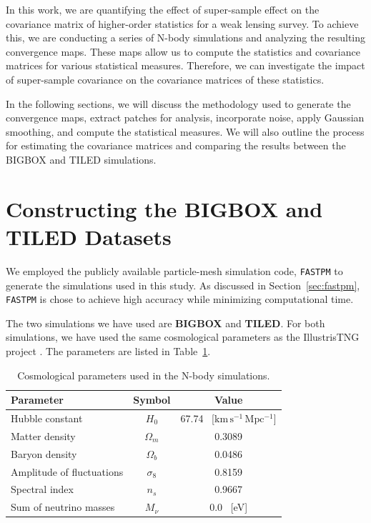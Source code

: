 
In this work, we are quantifying the effect of super-sample effect on the covariance matrix of higher-order statistics for a weak lensing survey. To achieve this, we are conducting a series of N-body simulations and analyzing the resulting convergence maps. These maps allow us to compute the statistics and covariance matrices for various statistical measures. Therefore, we can investigate the impact of super-sample covariance on the covariance matrices of these statistics.

In the following sections, we will discuss the methodology used to generate the convergence maps, extract patches for analysis, incorporate noise, apply Gaussian smoothing, and compute the statistical measures. We will also outline the process for estimating the covariance matrices and comparing the results between the BIGBOX and TILED simulations. 

\section{Constructing the BIGBOX and TILED Datasets}
We employed the publicly available particle-mesh simulation code, \texttt{FASTPM} \citep{10.1093/mnras/stw2123} to generate the simulations used in this study. As discussed in Section~\ref{sec:fastpm}, \texttt{FASTPM} is chose to achieve high accuracy while minimizing computational time. 

The two simulations we have used are \textbf{BIGBOX} and \textbf{TILED}. For both simulations, we have used the same cosmological parameters as the IllustrisTNG project \citep{2019ComAC...6....2N}. The parameters are listed in Table~\ref{tab:simulations}. 

\begin{table}[h]
    \centering
    \begin{tabular}{lcc}
    \toprule
    \textbf{Parameter} & \textbf{Symbol} & \textbf{Value} \\
    \midrule
    Hubble constant & $H_0$ & 67.74 \, [$\mathrm{km\,s^{-1}\,Mpc^{-1}}$] \\ 
    Matter density & $\Omega_m$ & 0.3089 \\
    Baryon density & $\Omega_b$ & 0.0486 \\
    Amplitude of fluctuations & $\sigma_8$ & 0.8159 \\
    Spectral index & $n_s$ & 0.9667 \\
    Sum of neutrino masses & $M_{\nu}$ & 0.0 \, [eV] \\
    \bottomrule
    \end{tabular}
    \caption{Cosmological parameters used in the N-body simulations.}\label{tab:simulations}
    \end{table}

